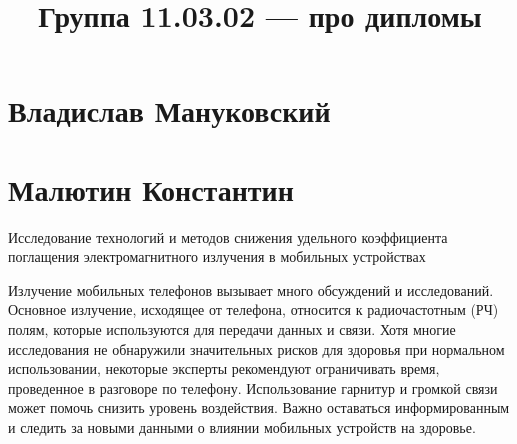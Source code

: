 \documentclass{article}
\title{Группа 11.03.02 --- про дипломы}
\begin{document}
\section*{Владислав Мануковский}

\section*{Малютин Константин}
Исследование технологий и методов снижения удельного коэффициента поглащения электромагнитного излучения в мобильных устройствах


Излучение мобильных телефонов вызывает много обсуждений и исследований. Основное излучение, исходящее от телефона, относится к радиочастотным (РЧ) полям, которые используются для передачи данных и связи. Хотя многие исследования не обнаружили значительных рисков для здоровья при нормальном использовании, некоторые эксперты рекомендуют ограничивать время, проведенное в разговоре по телефону. Использование гарнитур и громкой связи может помочь снизить уровень воздействия. Важно оставаться информированным и следить за новыми данными о влиянии мобильных устройств на здоровье.
\end{document}
